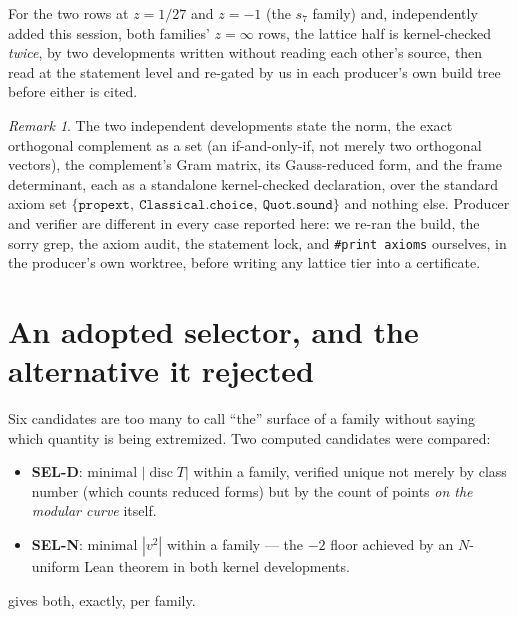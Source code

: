 \documentclass[11pt,a4paper]{article}
\theoremstyle{remark}
\newtheorem{remark}[theorem]{Remark}
\begin{document}
\begin{headlinebox}
For the two rows at $z=1/27$ and $z=-1$ (the $s_7$ family) and, independently added this session, both
families' $z=\infty$ rows, the lattice half is kernel-checked \emph{twice}, by two developments written
without reading each other's source, then read at the statement level and re-gated by us in each
producer's own build tree before either is cited.
\end{headlinebox}

\begin{remark}
The two independent developments state the norm, the exact orthogonal complement as a set (an
if-and-only-if, not merely two orthogonal vectors), the complement's Gram matrix, its Gauss-reduced form,
and the frame determinant, each as a standalone kernel-checked declaration, over the standard axiom set
$\{\texttt{propext},\ \texttt{Classical.choice},\ \texttt{Quot.sound}\}$ and nothing else. Producer and
verifier are different in every case reported here: we re-ran the build, the sorry grep, the axiom audit,
the statement lock, and \texttt{\#print axioms} ourselves, in the producer's own worktree, before writing
any lattice tier into a certificate.
\end{remark}

\section{An adopted selector, and the alternative it rejected}\label{sec:selector}

Six candidates are too many to call ``the'' surface of a family without saying which quantity is being
extremized. Two computed candidates were compared:

\begin{itemize}
\item \textbf{SEL-D}: minimal $|\operatorname{disc}T|$ within a family, verified unique not merely by
  class number (which counts reduced forms) but by the count of points \emph{on the modular curve}
  itself.
\item \textbf{SEL-N}: minimal $|v^2|$ within a family --- the $-2$ floor achieved by an $N$-uniform Lean
  theorem in both kernel developments.
\end{itemize}

 gives both, exactly, per family.

\begin{table}[h]
\centering

\caption{SEL-D and SEL-N disagree in both families. SEL-N is \emph{not unique} for $s_7$: two rows tie at
the $-2$ floor, corresponding to the two fixed points of the Atkin--Lehner involution $W_7$ on the
family's Hauptmodul coordinate.}\label{tab:selector}
\end{table}
\end{document}
